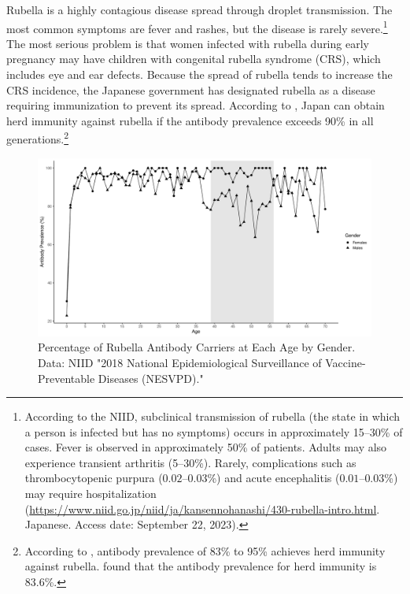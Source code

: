 \documentclass[
]{article}
\begin{document}
Rubella is a highly contagious disease spread through droplet transmission. The most common symptoms are fever and rashes, but the disease is rarely severe.\footnote{According to the NIID, subclinical transmission of rubella (the state in which a person is infected but has no symptoms) occurs in approximately 15--30\% of cases. Fever is observed in approximately 50\% of patients. Adults may also experience transient arthritis (5--30\%). Rarely, complications such as thrombocytopenic purpura (\(0.02\)--\(0.03\)\%) and acute encephalitis (\(0.01\)--\(0.03\)\%) may require hospitalization (\url{https://www.niid.go.jp/niid/ja/kansennohanashi/430-rubella-intro.html}. Japanese. Access date: September 22, 2023).} The most serious problem is that women infected with rubella during early pregnancy may have children with congenital rubella syndrome (CRS), which includes eye and ear defects. Because the spread of rubella tends to increase the CRS incidence, the Japanese government has designated rubella as a disease requiring immunization to prevent its spread. According to \citet{Kinoshita2016}, Japan can obtain herd immunity against rubella if the antibody prevalence exceeds 90\% in all generations.\footnote{According to \citet{Plans-Rubio2012}, antibody prevalence of 83\% to 95\% achieves herd immunity against rubella. \citet{Nishiura2015} found that the antibody prevalence for herd immunity is 83.6\%.}

\begin{figure}[t]
\includegraphics{discussion-paper_files/figure-latex/antibody-1} \caption{Percentage of Rubella Antibody Carriers at Each Age by Gender. Data: NIID "2018 National Epidemiological Surveillance of Vaccine-Preventable Diseases (NESVPD)."}\label{fig:antibody}
\end{figure}
\end{document}
